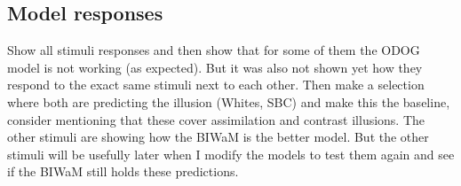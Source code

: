 \newpage

\subsection{Model responses}


Show all stimuli responses and then show that for some of them the ODOG model is not
working (as expected). But it was also not shown yet how they respond to the exact same
stimuli next to each other. Then make a selection where both are predicting the illusion
(Whites, SBC) and make this the baseline, consider mentioning that these cover
assimilation and contrast illusions. The other stimuli are showing how the BIWaM is the
better model. But the other stimuli will be usefully later when I modify the models to
test them again and see if the BIWaM still holds these predictions.

